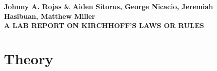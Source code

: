 \documentclass[12pt]{article}
\begin{document}
\begin{center}
    {\textbf{Johnny A. Rojas \& Aiden Sitorus, George Nicacio, Jeremiah
        Hasibuan, Matthew Miller}}\\
    {\Large \textbf{A LAB REPORT ON KIRCHHOFF'S LAWS OR RULES}}
\end{center}

\section{Theory}
\end{document}
